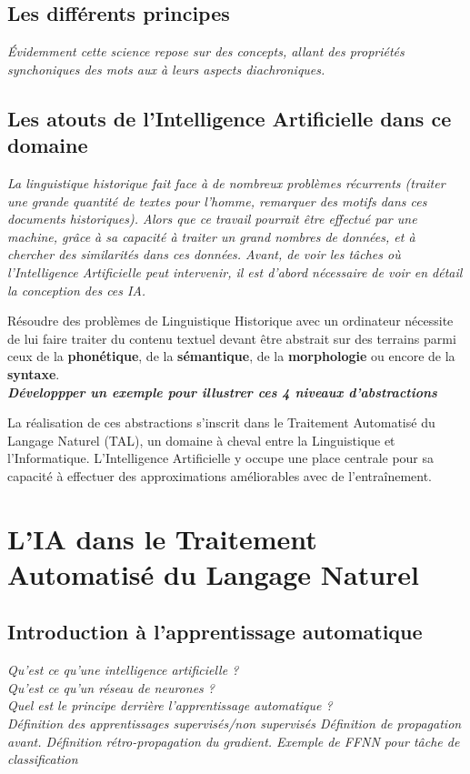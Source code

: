\documentclass[12pt, a4, french]{report}
\begin{document}
\subsection{Les différents principes}
\textit{Évidemment cette science repose sur des concepts, allant des propriétés synchoniques des mots aux à leurs aspects diachroniques.}
\subsection{Les atouts de l'Intelligence Artificielle dans ce domaine}
\textit{La linguistique historique fait face à de nombreux problèmes récurrents (traiter une grande quantité de textes pour l'homme, remarquer des motifs dans ces documents historiques). Alors que ce travail pourrait être effectué par une machine, grâce à sa capacité à traiter un grand nombres de données, et à chercher des similarités dans ces données. Avant, de voir les tâches où l'Intelligence Artificielle peut intervenir, il est d'abord nécessaire de voir en détail la conception des ces IA.}

Résoudre des problèmes de Linguistique Historique avec un ordinateur nécessite de lui faire traiter
du contenu textuel devant être abstrait sur des terrains parmi ceux de la \textbf{phonétique}, de la
\textbf{sémantique}, de la \textbf{morphologie} ou encore de la \textbf{syntaxe}.\\
\textbf{\textit{Développper un exemple pour illustrer ces 4 niveaux d'abstractions}}

La réalisation de ces abstractions s'inscrit dans le Traitement Automatisé du Langage Naturel (TAL),
un domaine à cheval entre la Linguistique et l'Informatique. L'Intelligence Artificielle y occupe
une place centrale pour sa capacité à effectuer des approximations améliorables avec de l'entraînement.


\section{L'IA dans le Traitement Automatisé du Langage Naturel}
\subsection{Introduction à l'apprentissage automatique}
\textit{Qu'est ce qu'une intelligence artificielle ?\\
    Qu'est ce qu'un réseau de neurones ?\\
    Quel est le principe derrière l'apprentissage automatique ?\\
    Définition des apprentissages supervisés/non supervisés
    Définition de propagation avant.
    Définition rétro-propagation du gradient.
    Exemple de FFNN pour tâche de classification}
\end{document}
